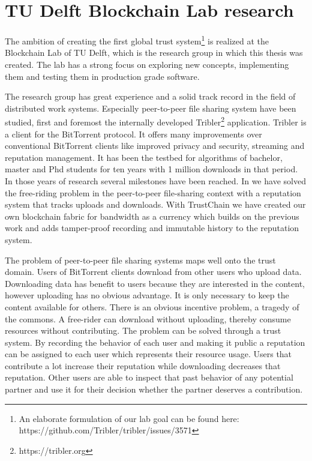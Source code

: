 
\section{TU Delft Blockchain Lab research}
The ambition of creating the first global trust system\footnote{An elaborate formulation of our lab goal can be found here: https://github.com/Tribler/tribler/issues/3571} is realized at the Blockchain Lab of TU Delft,
which is the research group in which this thesis was created. The lab has a strong focus on exploring
new concepts, implementing them and testing them in production grade software. 

The research group has great experience and a solid track record in the field of distributed work 
systems. Especially peer-to-peer file sharing system have been studied, first and foremost the 
internally developed Tribler\footnote{https://tribler.org} application. Tribler is a client for the
BitTorrent protocol. It offers many improvements over conventional BitTorrent clients like improved
privacy and security, streaming and reputation management. It has been the testbed for algorithms of
bachelor, master and Phd students for ten years with 1 million downloads in that period. In those 
years of research several milestones have been reached. In \cite{meulpolder2009bartercast} we have 
solved the free-riding problem in the peer-to-peer file-sharing context with a reputation system 
that tracks uploads and downloads. With TrustChain \cite{OTTE2017} we have created our own 
blockchain fabric for bandwidth as a currency which builds on the previous work and adds 
tamper-proof recording and immutable history to the reputation system.

The problem of peer-to-peer file sharing systems maps well onto the trust domain. Users of BitTorrent
clients download from other users who upload data. Downloading data has benefit to users because 
they are interested in the content, however uploading has no obvious advantage. It is only necessary
to keep the content available for others. There is an obvious incentive problem, a tragedy of the 
commons. A free-rider can download without uploading, thereby consume resources without contributing.
The problem can be solved through a trust system. By recording the behavior of each user and making
it public a reputation can be assigned to each user which represents their resource usage. Users 
that contribute a lot increase their reputation while downloading decreases that reputation. Other 
users are able to inspect that past behavior of any potential partner and use it for their decision 
whether the partner deserves a contribution. 


